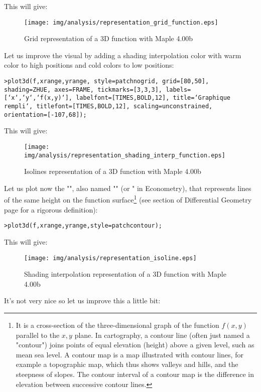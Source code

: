 This will give:

\begin{figure}[H]
\centering
\texttt{[image: img/analysis/representation\_grid\_function.eps]}
\caption{Grid representation of a 3D function with Maple 4.00b}
\end{figure}

Let us improve the visual by adding a shading interpolation color with warm color to high positions and cold colors to low positions:

\texttt{>plot3d(f,xrange,yrange, style=patchnogrid, grid=[80,50], shading=ZHUE, axes=FRAME, tickmarks=[3,3,3], labels=[`x`,`y`,`f(x,y)`], labelfont=[TIMES,BOLD,12], title=`Graphique rempli`, titlefont=[TIMES,BOLD,12], scaling=unconstrained, orientation=[-107,68]);}

This will give:

\begin{figure}[H]
\centering
\texttt{[image: img/analysis/representation\_shading\_interp\_function.eps]}
\caption{Isolines representation of a 3D function with Maple 4.00b}
\end{figure}

Let us plot now the "", also named "\label{isoline}" (or " in Econometry), that represents lines of the same height on the function surface\footnote{It is a cross-section of the three-dimensional graph of the function $f(x, y)$ parallel to the $x, y$ plane. In cartography, a contour line (often just named a "contour") joins points of equal elevation (height) above a given level, such as mean sea level. A contour map is a map illustrated with contour lines, for example a topographic map, which thus shows valleys and hills, and the steepness of slopes. The contour interval of a contour map is the difference in elevation between successive contour lines.} (see section of Differential Geometry page \pageref{isoline} for a rigorous definition):

\texttt{>plot3d(f,xrange,yrange,style=patchcontour);}

This will give:

\begin{figure}[H]
\centering
\texttt{[image: img/analysis/representation\_isoline.eps]}
\caption{Shading interpolation representation of a 3D function with Maple 4.00b}
\end{figure}

It's not very nice so let us improve this a little bit:

